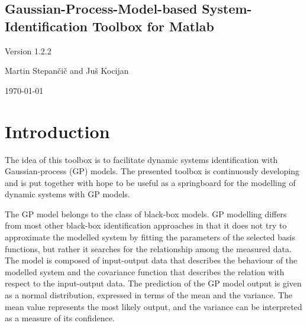 \documentclass[12pt,twoside]{article}
\begin{document}
\thispagestyle{empty}
\vspace{3cm}

\vspace{4cm}
\begin{center}
\section*{Gaussian-Process-Model-based System-Identification Toolbox for Matlab}
\end{center}
\begin{center}
\Large Version 1.2.2
\end{center}
 \vspace{3mm}
\vspace{3cm}
\begin{center}{\Large Martin Stepan\v ci\v c and Ju\v s Kocijan} \end{center}

  \vfill \centerline{\Large \today}
\pagebreak\setcounter{page}{1}
\newpage


\newpage
\thispagestyle{empty} \newpage {}
\setcounter{page}{1}

\section{Introduction}

The idea of this toolbox is to facilitate dynamic systems
identification with Gaussian-process (GP) models. The presented toolbox is continuously developing and is put together with hope to be useful
as a springboard for the modelling of dynamic systems with GP models.

The GP model belongs to the class of black-box models. GP modelling
differs from most other black-box identification approaches in that it does
not try to approximate the modelled system by fitting the parameters of the
selected basis functions, but rather it searches for the relationship among the measured data. The model is composed of input-output data that describes
the behaviour of the modelled system and the covariance function that describes the relation with respect to the input-output data. The prediction of
the GP model output is given as a normal distribution, expressed in terms
of the mean and the variance. The mean value represents the most likely
output, and the variance can be interpreted as a measure of its confidence.
\end{document}
